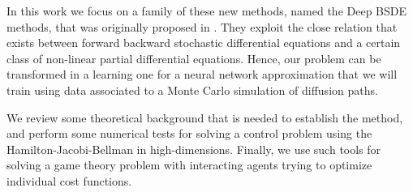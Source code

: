 In this work we focus on a family of these new methods, named the Deep BSDE methods, that was originally proposed in \cite{han_solving_2018}. They exploit the close relation that exists between forward backward stochastic differential equations and a certain class of non-linear partial differential equations. Hence, our problem can be transformed in a learning one for a neural network approximation that we will train using data associated to a Monte Carlo simulation of diffusion paths.

We review some theoretical background that is needed to establish the method, and perform some numerical tests for solving a control problem using the Hamilton-Jacobi-Bellman in high-dimensions. Finally, we use such tools for solving a game theory problem with interacting agents trying to optimize individual cost functions. 